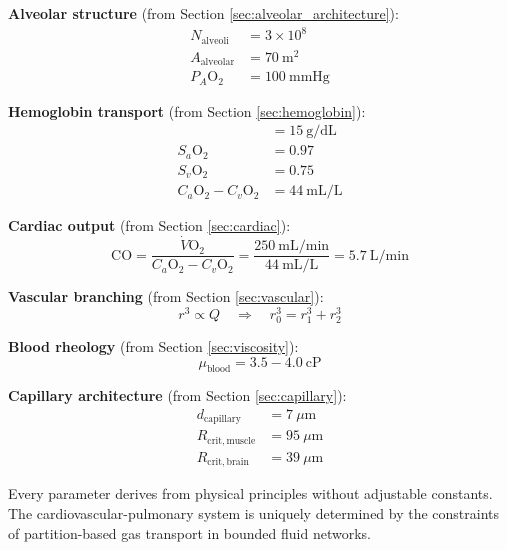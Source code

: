 \documentclass[10pt,twocolumn,a4paper]{article}
\theoremstyle{remark}
\begin{document}
\textbf{Alveolar structure} (from Section \ref{sec:alveolar_architecture}):
\begin{align}
N_{\mathrm{alveoli}} &= 3 \times 10^{8} \\
A_{\mathrm{alveolar}} &= 70~\mathrm{m}^{2} \\
P_{A}\mathrm{O}_{2} &= 100~\mathrm{mmHg}
\end{align}

\textbf{Hemoglobin transport} (from Section \ref{sec:hemoglobin}):
\begin{align}
[\mathrm{Hb}] &= 15~\mathrm{g/dL} \\
S_{a}\mathrm{O}_{2} &= 0.97 \\
S_{v}\mathrm{O}_{2} &= 0.75 \\
C_{a}\mathrm{O}_{2} - C_{v}\mathrm{O}_{2} &= 44~\mathrm{mL/L}
\end{align}

\textbf{Cardiac output} (from Section \ref{sec:cardiac}):
\begin{equation}
\mathrm{CO} = \frac{\dot{V}\mathrm{O}_{2}}{C_{a}\mathrm{O}_{2} - C_{v}\mathrm{O}_{2}} = \frac{250~\mathrm{mL/min}}{44~\mathrm{mL/L}} = 5.7~\mathrm{L/min}
\end{equation}

\textbf{Vascular branching} (from Section \ref{sec:vascular}):
\begin{equation}
r^{3} \propto Q \quad \Rightarrow \quad r_{0}^{3} = r_{1}^{3} + r_{2}^{3}
\end{equation}

\textbf{Blood rheology} (from Section \ref{sec:viscosity}):
\begin{equation}
\mu_{\mathrm{blood}} = 3.5-4.0~\mathrm{cP}
\end{equation}

\textbf{Capillary architecture} (from Section \ref{sec:capillary}):
\begin{align}
d_{\mathrm{capillary}} &= 7~\mu\mathrm{m} \\
R_{\mathrm{crit,muscle}} &= 95~\mu\mathrm{m} \\
R_{\mathrm{crit,brain}} &= 39~\mu\mathrm{m}
\end{align}

Every parameter derives from physical principles without adjustable constants. The cardiovascular-pulmonary system is uniquely determined by the constraints of partition-based gas transport in bounded fluid networks.
\end{document}
